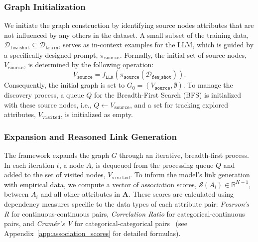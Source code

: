 \subsubsection{Graph Initialization}
We initiate the graph construction by identifying source nodes attributes that are not influenced by any others in the dataset. A small subset of the training data, $\mathcal{D}_{\mathtt{few\_shot}} \subseteq \mathcal{D}_{\mathtt{train}}$, serves as in-context examples for the LLM, which is guided by a specifically designed prompt, $\pi_{\mathtt{source}}$. Formally, the initial set of source nodes, $V_{\mathtt{source}}$, is determined by the following operation:
\begin{equation}
    V_{\mathtt{source}} = f_{\mathtt{LLM}}(\pi_{\mathtt{source}} ( \mathcal{D}_{\mathtt{few\_shot}})) .
\end{equation}
Consequently, the initial graph is set to $G_0 = (V_{\mathtt{source}}, \emptyset)$. To manage the discovery process, a queue $Q$ for the Breadth-First Search (BFS) is initialized with these source nodes, i.e., $Q \leftarrow V_{\mathtt{source}}$, and a set for tracking explored attributes, $V_{\mathtt{visited}}$, is initialized as empty.

\subsubsection{Expansion and Reasoned Link Generation}

The framework expands the graph $G$ through an iterative, breadth-first process. In each iteration $t$, a node $A_i$ is dequeued from the processing queue $Q$ and added to the set of visited nodes, $V_{\mathtt{visited}}$. To inform the model's link generation with empirical data, we compute a vector of association scores, $\mathcal{S}(A_i) \in \mathbb{R}^{K-1}$, between $A_i$ and all other attributes in $\mathbf{A}$. These scores are calculated using dependency measures specific to the data types of each attribute pair: \textit{Pearson's R} for continuous-continuous pairs, \textit{Correlation Ratio} for categorical-continuous pairs, and \textit{Cramér's V} for categorical-categorical pairs~\cite{agresti2011categorical} (see Appendix~\ref{app:association_scores} for detailed formulas).

